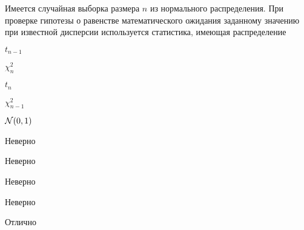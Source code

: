 
\begin{question}
Имеется случайная выборка размера \(n\) из нормального распределения.
При проверке гипотезы о равенстве математического ожидания заданному
значению при известной дисперсии используется статистика, имеющая
распределение
\begin{answerlist}
  \item \(t_{n-1}\)
  \item \(\chi^2_n\)
  \item \(t_n\)
  \item \(\chi^2_{n-1}\)
  \item \(\mathcal{N}(0,1)\)
\end{answerlist}
\end{question}

\begin{solution}
\begin{answerlist}
  \item Неверно
  \item Неверно
  \item Неверно
  \item Неверно
  \item Отлично
\end{answerlist}
\end{solution}

